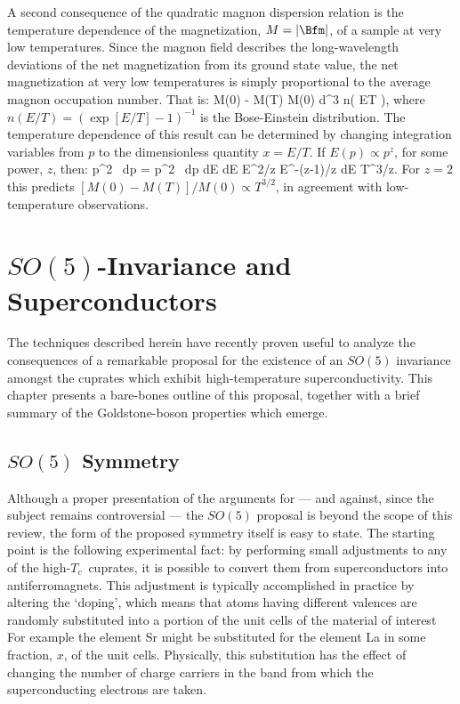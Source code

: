 \documentclass[12pt]{report}
\def\Tc{$T_c$}
\begin{document}
A second consequence of the quadratic magnon dispersion
relation is the temperature dependence of the
magnetization, $M = |\Bfm|$, of a sample at very low
temperatures. Since the magnon field describes the
long-wavelength deviations of the net magnetization from
its ground state value, the net magnetization at very low
temperatures is simply proportional to the average magnon
occupation number. That is:
%
\eq
\label{lowtmagnetization}
M(0) - M(T)  \propto M(0) \; \int 
d^3\bfp \; n\left( {E\over T} \right),
\eeq
%
where $n(E/T) = (\exp[E/T] - 1)^{-1}$ is the Bose-Einstein
distribution. The temperature dependence of this result can
be determined by changing integration variables from $p$ to
the dimensionless quantity $x = E/T$. If $E(p) \propto
p^z$, for some power, $z$, then:
%
\eq
\label{scalinglaws}
p^2 \, dp = p^2 \, {dp \over dE} \; 
dE \propto E^{2/z} \; E^{-(z-1)/z} \; dE
\propto T^{3/z}.
\eeq
%
For $z = 2$ this predicts $[M(0) - M(T)]/M(0) \propto
T^{3/2}$, in agreement with low-temperature observations.

\chapter{$SO(5)$-Invariance and Superconductors}

The techniques described herein have recently proven useful
to analyze the consequences of a remarkable  proposal for
the existence of an $SO(5)$ invariance  amongst the
cuprates which exhibit high-temperature superconductivity.
This chapter presents a bare-bones outline of this
proposal, together with a brief summary of the
Goldstone-boson properties which emerge.

\section{$SO(5)$ Symmetry}

Although a proper presentation of the arguments  for ---
and against, since the subject remains controversial ---
the $SO(5)$ proposal is beyond the scope of this review, 
the form of the proposed symmetry itself is easy
to state. The starting point is the following experimental
fact: by performing small adjustments to any of the
high-\Tc\ cuprates, it is possible to convert them from
superconductors into antiferromagnets. This adjustment
is typically accomplished in practice
by altering the `doping', which means that
atoms having different valences are randomly substituted 
into a portion of the unit cells of the material of interest
For example the element Sr might be substituted
for the element La in some fraction, $x$, of the unit cells. 
Physically, this substitution
has the effect of changing the number of charge carriers 
in the band from which  the
superconducting electrons are taken. 
\end{document}
